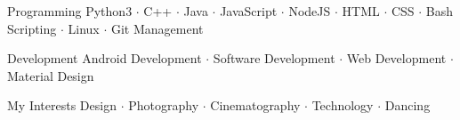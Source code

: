 

\begin{cvskills}

  \cvskill
    {Programming} %
    {Python3 $\cdot$ C++ $\cdot$ Java $\cdot$ JavaScript $\cdot$ NodeJS $\cdot$ HTML $\cdot$ CSS $\cdot$ Bash Scripting  $\cdot$ Linux $\cdot$ Git Management } %

  \cvskill
    {Development} %
    {Android Development $\cdot$ Software Development $\cdot$ Web Development $\cdot$ Material Design} %

\cvskill
{My Interests} %
{Design $\cdot$ Photography $\cdot$ Cinematography $\cdot$ Technology $\cdot$  Dancing} %

\end{cvskills}